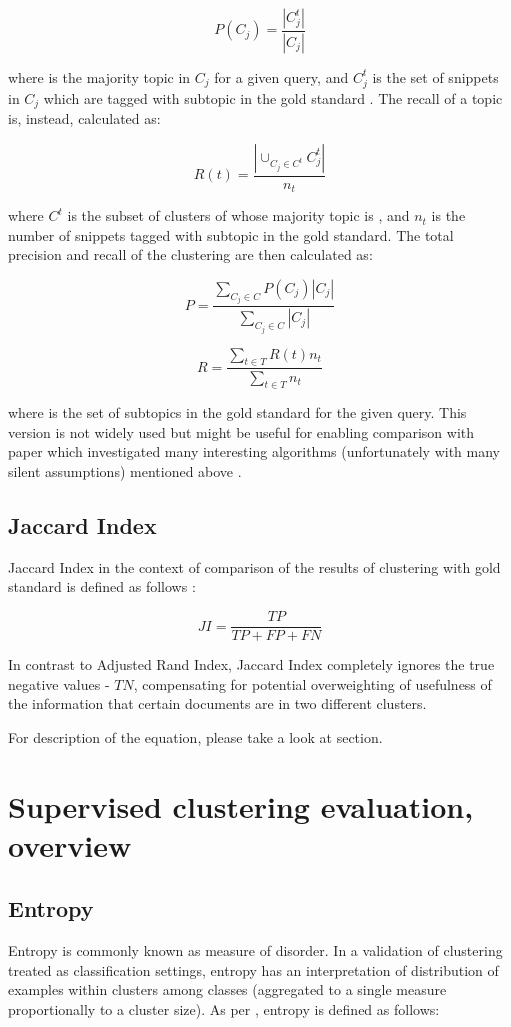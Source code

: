 \documentclass[a4paper, 12pt, oneside]{Thesis} %
\begin{document}
$$ P(C_j) = \frac{|C_j^t|}{|C_j|} $$

where  is the majority topic in $ C_j $ for a given query, and $ C_j^t $ is the set of snippets in $ C_j $ which are tagged with subtopic  in the gold standard . The recall of a topic  is, instead, calculated as:

$$ R(t) = \frac{|\cup_{C_j \in C^t}C_j^t|}{n_t} $$

where $ C^t $ is the subset of clusters of  whose majority topic is , and $ n_t $ is the number of snippets tagged with subtopic  in the gold standard. The total precision and recall of the clustering  are then calculated as:

$$ P = \frac{\sum_{C_j \in C} P(C_j)|C_j|}{\sum_{C_j \in C} |C_j|} $$

$$ R = \frac{\sum_{t \in T} R(t)n_t}{\sum_{t \in T} n_t} $$

where  is the set of subtopics in the gold standard  for the given query. This version is not widely used but might be useful for enabling comparison with paper which investigated many interesting algorithms (unfortunately with many silent assumptions) mentioned above \cite{di2013clustering}. 

\subsection{Jaccard Index}\label{section:Jaccard} Jaccard Index in the context of comparison of the results of clustering  with gold standard  is defined as follows \cite{di2013clustering}:

$$ JI = \frac{TP}{TP + FP + FN} $$

In contrast to Adjusted Rand Index, Jaccard Index completely ignores the true negative values - $TN$, compensating for potential overweighting of usefulness of the information that certain documents are in two different clusters.

For description of the equation, please take a look at  section.

\section{Supervised clustering evaluation, overview}

\subsection{Entropy} Entropy is commonly known as measure of disorder. In a validation of clustering treated as classification settings, entropy has an interpretation of distribution of examples within clusters among classes (aggregated to a single measure proportionally to a cluster size).
As per \cite{andrews2007recent}, entropy is defined as follows:
\end{document}

